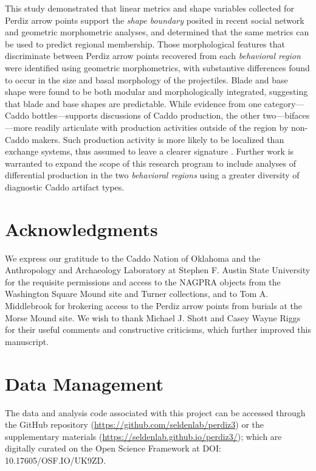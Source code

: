 \documentclass[smallextended]{svjour3}       %
\begin{document}
This study demonstrated that linear metrics and shape variables
collected for Perdiz arrow points support the \emph{shape boundary}
posited in recent social network and geometric morphometric analyses,
and determined that the same metrics can be used to predict regional
membership. Those morphological features that discriminate between
Perdiz arrow points recovered from each \emph{behavioral region} were
identified using geometric morphometrics, with substantive differences
found to occur in the size and basal morphology of the projectiles.
Blade and base shape were found to be both modular and morphologically
integrated, suggesting that blade and base shapes are predictable. While
evidence from one category---Caddo bottles---supports discussions of
Caddo production, the other two---bifaces---more readily articulate with
production activities outside of the region by non-Caddo makers. Such
production activity is more likely to be localized than exchange
systems, thus assumed to leave a clearer signature \cite{RN7019}.
Further work is warranted to expand the scope of this research program
to include analyses of differential production in the two
\emph{behavioral regions} using a greater diversity of diagnostic Caddo
artifact types.

\hypertarget{acknowledgments}{%
\section*{Acknowledgments}\label{acknowledgments}}

We express our gratitude to the Caddo Nation of Oklahoma and the
Anthropology and Archaeology Laboratory at Stephen F. Austin State
University for the requisite permissions and access to the NAGPRA
objects from the Washington Square Mound site and Turner collections,
and to Tom A. Middlebrook for brokering access to the Perdiz arrow
points from burials at the Morse Mound site. We wish to thank Michael J.
Shott and Casey Wayne Riggs for their useful comments and constructive
criticisms, which further improved this manuscript.

\hypertarget{data-management}{%
\section*{Data Management}\label{data-management}}

The data and analysis code associated with this project can be accessed
through the GitHub repository
(\url{https://github.com/seldenlab/perdiz3}) or the supplementary
materials (\url{https://seldenlab.github.io/perdiz3/}); which are
digitally curated on the Open Science Framework at \newline DOI:
10.17605/OSF.IO/UK9ZD.




\end{document}
